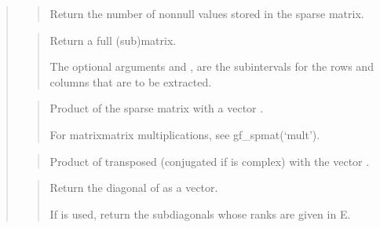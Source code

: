 \documentclass[a4paper,11pt,english]{sphinxmanual}
\begin{document}
\sphinxAtStartPar
{}
\begin{quote}

\sphinxAtStartPar
{}
\begin{quote}

\sphinxAtStartPar
Return the number of non\sphinxhyphen{}null values stored in the sparse matrix.
\end{quote}

\sphinxAtStartPar
{}
\begin{quote}

\sphinxAtStartPar
Return a full (sub\sphinxhyphen{})matrix.

\sphinxAtStartPar
The optional arguments  and , are the sub\sphinxhyphen{}intervals for the
rows and columns that are to be extracted.
\end{quote}

\sphinxAtStartPar
{}
\begin{quote}

\sphinxAtStartPar
Product of the sparse matrix  with a vector .

\sphinxAtStartPar
For matrix\sphinxhyphen{}matrix multiplications, see gf\_spmat(‘mult’).
\end{quote}

\sphinxAtStartPar
{}
\begin{quote}

\sphinxAtStartPar
Product of  transposed (conjugated if  is complex) with the
vector .
\end{quote}

\sphinxAtStartPar
{}
\begin{quote}

\sphinxAtStartPar
Return the diagonal of  as a vector.

\sphinxAtStartPar
If  is used, return the sub\sphinxhyphen{}diagonals whose ranks are given in E.
\end{quote}


\end{quote}
\end{document}

